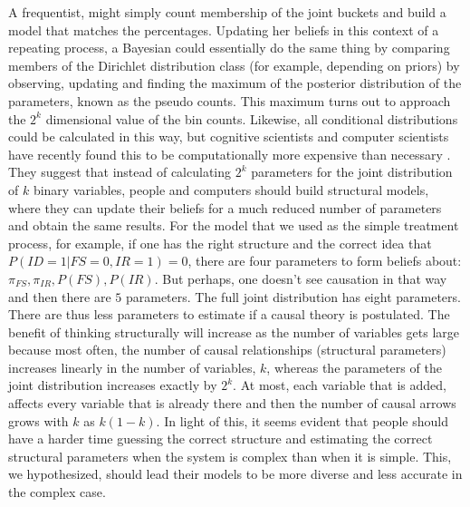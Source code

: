 A frequentist, might simply count membership of the joint buckets and build a model that matches the percentages. Updating her beliefs in this context of a repeating process, a Bayesian could essentially do the same thing by comparing members of the Dirichlet distribution class (for example, depending on priors) by observing, updating and finding the maximum of the posterior distribution of the parameters, known as the pseudo counts. This maximum turns out to approach the $2^k$ dimensional value of the bin counts. Likewise, all conditional distributions could be calculated in this way, but cognitive scientists and computer scientists have recently found this to be computationally more expensive than necessary \citep{Griffith08, Koller03}.  They suggest that instead of calculating $2^k$ parameters for the joint distribution of $k$ binary variables, people and computers should build structural models, where they can update their beliefs for a much reduced number of parameters and obtain the same results. For the model that we used as the simple treatment process, for example, if one has the right structure and the correct idea that $P(ID=1|FS=0, IR=1)=0$, there are four parameters to form beliefs about: $\pi_{FS}, \pi_{IR}, P(FS), P(IR)$. But perhaps, one doesn't see causation in that way and then there are $5$ parameters.  The full joint distribution has eight parameters.  There are thus less parameters to estimate if a causal theory is postulated. The benefit of thinking structurally will increase as the number of variables gets large because most often, the number of causal relationships (structural parameters) increases linearly in the number of variables, $k$, whereas the parameters of the joint distribution increases exactly by $2^k$.  At most, each variable that is added, affects every variable that is already there and then the number of causal arrows grows with $k$ as $k(1-k)$. In light of this, it seems evident that people should have a harder time guessing the correct structure and estimating the correct structural parameters when the system is complex than when it is simple. This, we hypothesized, should lead their models to be more diverse and less accurate in the complex case. 



